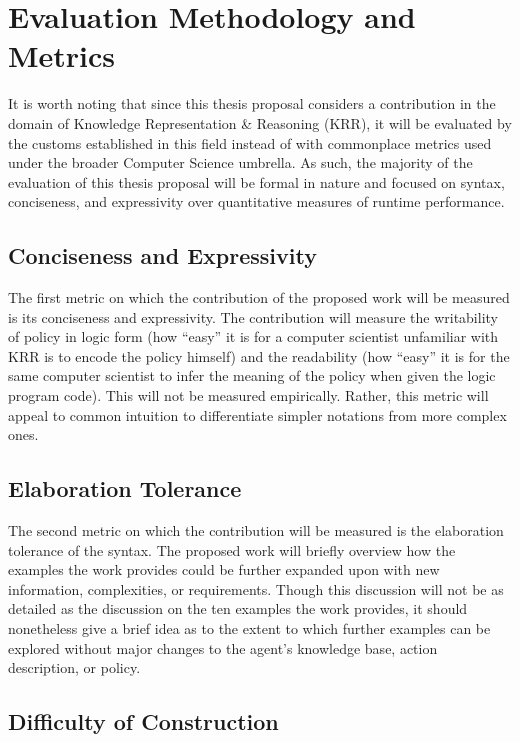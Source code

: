 \section{Evaluation Methodology and Metrics}

It is worth noting that since this thesis proposal considers a contribution in the domain of Knowledge Representation \& Reasoning (KRR), it will be evaluated by the customs established in this field instead of with commonplace metrics used under the broader Computer Science umbrella.
As such, the majority of the evaluation of this thesis proposal will be formal in nature and focused on syntax, conciseness, and expressivity over quantitative measures of runtime performance.

\subsection{Conciseness and Expressivity}

The first metric on which the contribution of the proposed work will be measured is its conciseness and expressivity.
The contribution will measure the writability of policy in logic form (how ``easy'' it is for a computer scientist unfamiliar with KRR is to encode the policy himself) and the readability (how ``easy'' it is for the same computer scientist to infer the meaning of the policy when given the logic program code).
This will not be measured empirically.
Rather, this metric will appeal to common intuition to differentiate simpler notations from more complex ones.

\subsection{Elaboration Tolerance}

The second metric on which the contribution will be measured is the elaboration tolerance of the syntax.
The proposed work will briefly overview how the examples the work provides could be further expanded upon with new information, complexities, or requirements.
Though this discussion will not be as detailed as the discussion on the ten examples the work provides, it should nonetheless give a brief idea as to the extent to which further examples can be explored without major changes to the agent's knowledge base, action description, or policy.

\subsection{Difficulty of Construction}


